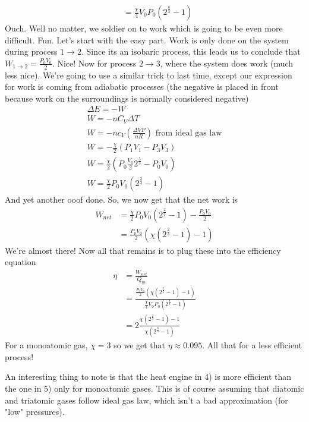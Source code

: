 \begin{enumerate}
\begin{enumerate}
\begin{align*}
            &= \frac{\chi}{4}V_0P_0(2^{\frac{8}{3}} - 1)
        \end{align*}
        Ouch. Well no matter, we soldier on to work which is going to be even more difficult. Fun. Let's start with the easy part. Work is only done on the system during process $1 \rightarrow 2$. Since its an isobaric process, this leads us to conclude that $W_{1\rightarrow 2} = \frac{P_0V_0}{2}$. Nice! Now for process $2 \rightarrow 3$, where the system does work (much less nice). We're going to use a similar trick to last time, except our expression for work is coming from adiabatic processes (the negative is placed in front because work on the surroundings is normally considered negative)
        \begin{gather*}
            \Delta E = -W \\
            W = -nC_V\Delta T \\
            W = -nc_V(\frac{\Delta VP}{nR}) \text{  from ideal gas law} \\
            W = -\frac{\chi}{2}(P_1V_1 - P_3V_3) \\
            W = \frac{\chi}{2}(P_0\frac{V_0}{2}2^{\frac{5}{3}} - P_0V_0) \\
            W = \frac{\chi}{2}P_0V_0(2^{\frac{2}{3}} - 1)
        \end{gather*}
        And yet another ooof done. So, we now get that the net work is
        \begin{align*}
            W_{net} &= \frac{\chi}{2}P_0V_0(2^{\frac{2}{3}} - 1) - \frac{P_0V_0}{2} \\
            &= \frac{P_0V_0}{2}(\chi(2^{\frac{2}{3}} - 1) - 1)
        \end{align*}
        We're almost there! Now all that remains is to plug these into the efficiency equation
        \begin{align*}
            \eta &= \frac{W_{net}}{Q_{in}} \\
            &= \frac{\frac{P_0V_0}{2}(\chi(2^{\frac{2}{3}} - 1) - 1)}{\frac{\chi}{4}V_0P_0(2^{\frac{8}{3}} - 1)} \\
            &= 2\frac{\chi(2^{\frac{2}{3}} - 1) - 1}{\chi(2^{\frac{8}{3}} - 1)}
        \end{align*}
        For a monoatomic gas, $\chi = 3$ so we get that $\eta \approx 0.095$. All that for a less efficient process!
    \end{enumerate}
    An interesting thing to note is that the heat engine in 4) is more efficient than the one in 5) only for monoatomic gases. This is of course assuming that diatomic and triatomic gases follow ideal gas law, which isn't a bad approximation (for "low" pressures).

\end{enumerate}
